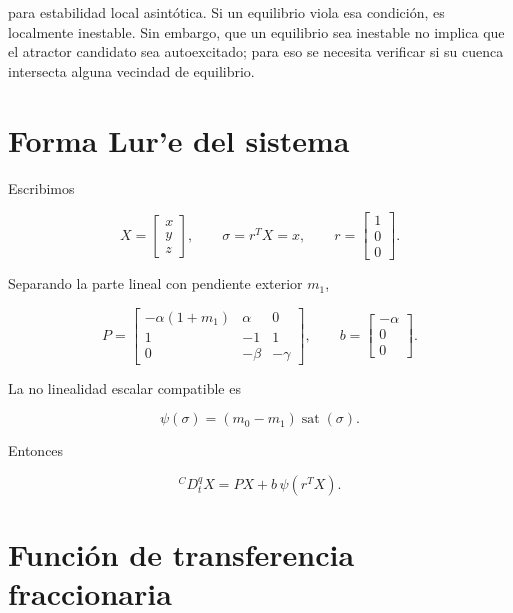 \documentclass[11pt]{article}
\begin{document}
para estabilidad local asintótica. Si un equilibrio viola esa condición, es localmente inestable. Sin embargo, que un equilibrio sea inestable no implica que el atractor candidato sea autoexcitado; para eso se necesita verificar si su cuenca intersecta alguna vecindad de equilibrio.

\section{Forma Lur'e del sistema}

Escribimos

\begin{equation}
X=
\begin{bmatrix}
x\\y\\z
\end{bmatrix},
\qquad
\sigma=r^T X=x,
\qquad
r=
\begin{bmatrix}
1\\0\\0
\end{bmatrix}.
\end{equation}

Separando la parte lineal con pendiente exterior \(m_1\),

\begin{equation}
P=
\begin{bmatrix}
-\alpha(1+m_1)&\alpha&0\\
1&-1&1\\
0&-\beta&-\gamma
\end{bmatrix},
\qquad
b=
\begin{bmatrix}
-\alpha\\0\\0
\end{bmatrix}.
\end{equation}

La no linealidad escalar compatible es

\begin{equation}
\psi(\sigma)=(m_0-m_1)\operatorname{sat}(\sigma).
\end{equation}

Entonces

\begin{equation}
{}^C D_t^q X=PX+b\,\psi(r^TX).
\end{equation}

\section{Función de transferencia fraccionaria}
\end{document}
